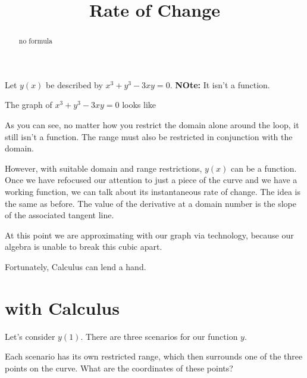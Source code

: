 \documentclass{ximera}
\title{Rate of Change}
\begin{document}
\begin{abstract}
no formula
\end{abstract}
\maketitle




Let $y(x)$ be described by $x^3 + y^3 - 3 x y = 0$. \textbf{NOte: } It isn't a function.



The graph of $x^3 + y^3 - 3 x y = 0$ looks like




\begin{center}
\end{center}


As you can see, no matter how you restrict the domain alone around the loop, it still isn't a function. The range must also be restricted in conjunction with the domain.

However, with suitable domain and range restrictions, $y(x)$ can be a function. \\


Once we have refocused our attention to just a piece of the curve and we have a working function, we can talk about its instantaneous rate of change.  The idea is the same as before.  The value of the derivative at a domain number is the slope of the associated tangent line.


At this point we are approximating with our graph via technology, because our algebra is unable to break this cubic apart.



Fortunately, Calculus can lend a hand.




\section{with Calculus}

Let's consider $y(1)$.  There are three scenarios for our function $y$.


\begin{center}
\end{center}

Each scenario has its own restricted range, which then surrounds one of the three points on the curve. What are the coordinates of these points?
\end{document}
